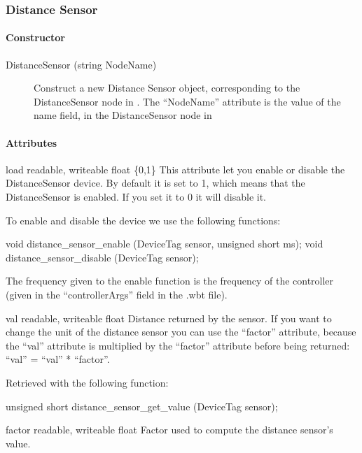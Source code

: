 \subsubsection{Distance Sensor}

\paragraph{Constructor}

\noindent
\begin{description}
\item[{DistanceSensor (string NodeName)}] Construct a new Distance
  Sensor object, corresponding to the DistanceSensor node in
  \webots. The ``NodeName'' attribute is the value of the name field,
  in the DistanceSensor node in \webots
\end{description}

\paragraph{Attributes}

\begin{itemize}
\begin{attribute}{load}
  {readable, writeable}
  {float}
  {\{0,1\}}
  This attribute let you enable or disable the
  DistanceSensor device.  By default it is set to 1, which means that
  the DistanceSensor is enabled. If you set it to 0 it will disable
  it.

  To enable and disable the device we use the following \webots
  functions:
\begin{cxx}
void distance_sensor_enable (DeviceTag sensor, unsigned short ms);
void distance_sensor_disable (DeviceTag sensor);
\end{cxx}

The frequency given to the enable function is the frequency of the
\urbi controller (given in the ``controllerArgs'' field in the .wbt
file).
\end{attribute}

\begin{attribute}{val}
  {readable, writeable}
  {float}
  {}
  Distance returned by the sensor. If you want to change
 the unit of the distance sensor you can use the ``factor'' attribute,
 because the ``val'' attribute is multiplied by the ``factor'' attribute
 before being returned: ``val'' = ``val'' * ``factor''.

 Retrieved with the following \webots function:

\begin{cxx}
unsigned short distance_sensor_get_value  (DeviceTag sensor);
\end{cxx}
\end{attribute}

\begin{attribute}{factor}
  {readable, writeable}
  {float}
  {}
  Factor used to compute the distance sensor's value.
\end{attribute}
\end{itemize}

